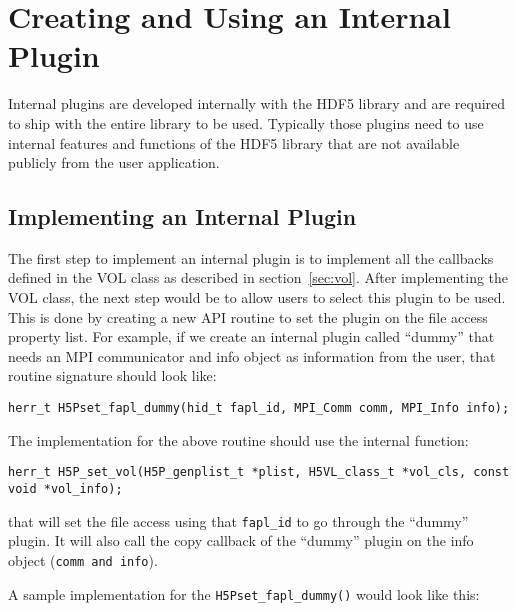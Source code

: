 \section{Creating and Using an Internal Plugin}
Internal plugins are developed internally with the HDF5 library and
are required to ship with the entire library to be used. Typically
those plugins need to use internal features and functions of the HDF5
library that are not available publicly from the user application.

\subsection{Implementing an Internal Plugin}
The first step to implement an internal plugin is to implement all the callbacks defined in the VOL class as described in section~\ref{sec:vol}. After implementing the VOL class, the next step would be to allow users to select
this plugin to be used. This is done by creating a new API routine to
set the plugin on the file access property list. For example, if we
create an internal plugin called ``dummy'' that needs an MPI
communicator and info object as information from the user, that
routine signature should look like:

\begin{lstlisting}
herr_t H5Pset_fapl_dummy(hid_t fapl_id, MPI_Comm comm, MPI_Info info);
\end{lstlisting}

The implementation for the above routine should use the internal
function:
\begin{lstlisting}
herr_t H5P_set_vol(H5P_genplist_t *plist, H5VL_class_t *vol_cls, const
void *vol_info);
\end{lstlisting}
that will set the file access using that {\tt fapl\_id} to go through
the ``dummy'' plugin. It will also call the copy callback of the
``dummy'' plugin on the info object ({\tt comm and info}).

A sample implementation for the {\tt H5Pset\_fapl\_dummy()} would look like this:

